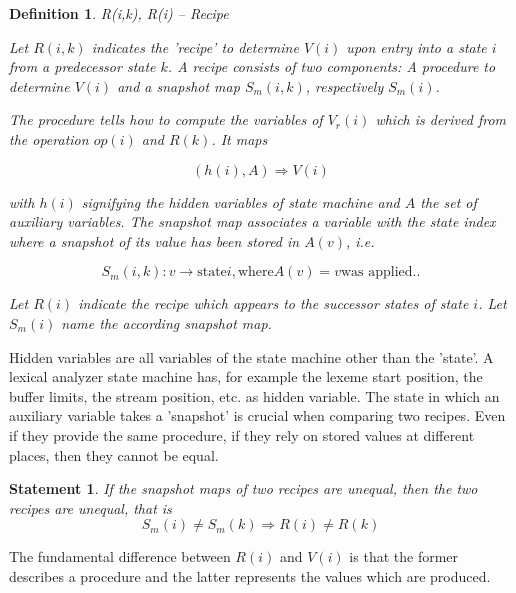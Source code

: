 \documentclass[12pt,a4paper]{scrartcl}
\theoremstyle{break}
\newtheorem{definition}{Definition}
\newtheorem{statement}{Statement}
\begin{document}
\begin{definition}
R(i,k), R(i) -- Recipe 

Let $R(i,k)$ indicates the 'recipe' to determine $V(i)$ upon entry into a state
$i$ from a predecessor state $k$.  A recipe consists of two components: A
procedure to determine $V(i)$ and a snapshot map $S_m(i,k)$, respectively
$S_m(i)$.

The {\it procedure} tells how to compute the variables of $V_r(i)$ which is derived
from the operation $op(i)$ and $R(k)$.  It maps

\begin{equation} \label{eq:recipe-procedure}
    (h(i), A) \Rightarrow V(i)                                             
\end{equation}

with $h(i)$ signifying the hidden variables of state machine and $A$ the set of
auxiliary variables.  The {\it snapshot map} associates a variable with the state
index where a snapshot of its value has been stored in $A(v)$, i.e.

\begin{equation}
    \label{eq:snapshot-map}
    S_m(i,k):  v \rightarrow \mbox{state} i, \mbox{where} A(v) = v \mbox{was applied.}.
\end{equation}

Let $R(i)$ indicate the recipe which appears to the successor states of
state $i$. Let $S_m(i)$ name the according snapshot map.
\end{definition}

Hidden variables are all variables of the state machine other than the 'state'.
A lexical analyzer state machine has, for example the lexeme start position,
the buffer limits, the stream position, etc. as hidden variable. The state
in which an auxiliary variable takes a 'snapshot' is crucial when comparing
two recipes. Even if they provide the same procedure, if they rely on stored
values at different places, then they cannot be equal.

\begin{statement}
   If the snapshot maps of two recipes are unequal, then the two recipes
   are unequal, that is
   \begin{equation} \label{eq:snapshot-map-difference}
       S_m(i) \neq S_m(k) \Rightarrow R(i) \neq R(k)
   \end{equation}
\end{statement}

The fundamental difference between $R(i)$ and $V(i)$ is that the former describes
a procedure and the latter represents the values which are produced.
\end{document}
